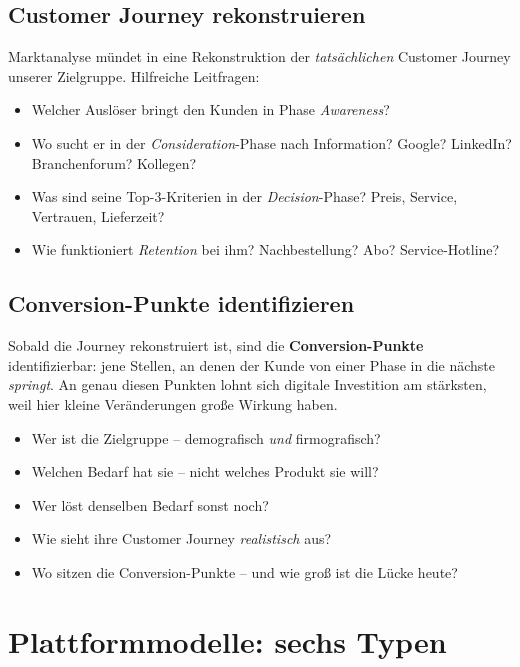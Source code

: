 \documentclass[11pt,a4paper,oneside]{article}
\newcommand{\fachbegriff}[1]{\textbf{#1}}
\begin{document}
\subsection{Customer Journey rekonstruieren}

Marktanalyse mündet in eine Rekonstruktion der \emph{tatsächlichen} Customer Journey unserer Zielgruppe. Hilfreiche Leitfragen:

\begin{itemize}
  \item Welcher Auslöser bringt den Kunden in Phase \emph{Awareness}?
  \item Wo sucht er in der \emph{Consideration}-Phase nach Information? Google? LinkedIn? Branchenforum? Kollegen?
  \item Was sind seine Top-3-Kriterien in der \emph{Decision}-Phase? Preis, Service, Vertrauen, Lieferzeit?
  \item Wie funktioniert \emph{Retention} bei ihm? Nachbestellung? Abo? Service-Hotline?
\end{itemize}

\subsection{Conversion-Punkte identifizieren}

Sobald die Journey rekonstruiert ist, sind die \fachbegriff{Conversion-Punkte} identifizierbar: jene Stellen, an denen der Kunde von einer Phase in die nächste \emph{springt}. An genau diesen Punkten lohnt sich digitale Investition am stärksten, weil hier kleine Veränderungen große Wirkung haben.

\begin{merkbox}
\begin{itemize}
  \item Wer ist die Zielgruppe -- demografisch \emph{und} firmografisch?
  \item Welchen Bedarf hat sie -- nicht welches Produkt sie will?
  \item Wer löst denselben Bedarf sonst noch?
  \item Wie sieht ihre Customer Journey \emph{realistisch} aus?
  \item Wo sitzen die Conversion-Punkte -- und wie groß ist die Lücke heute?
\end{itemize}
\end{merkbox}

\section{Plattformmodelle: sechs Typen}
\end{document}
